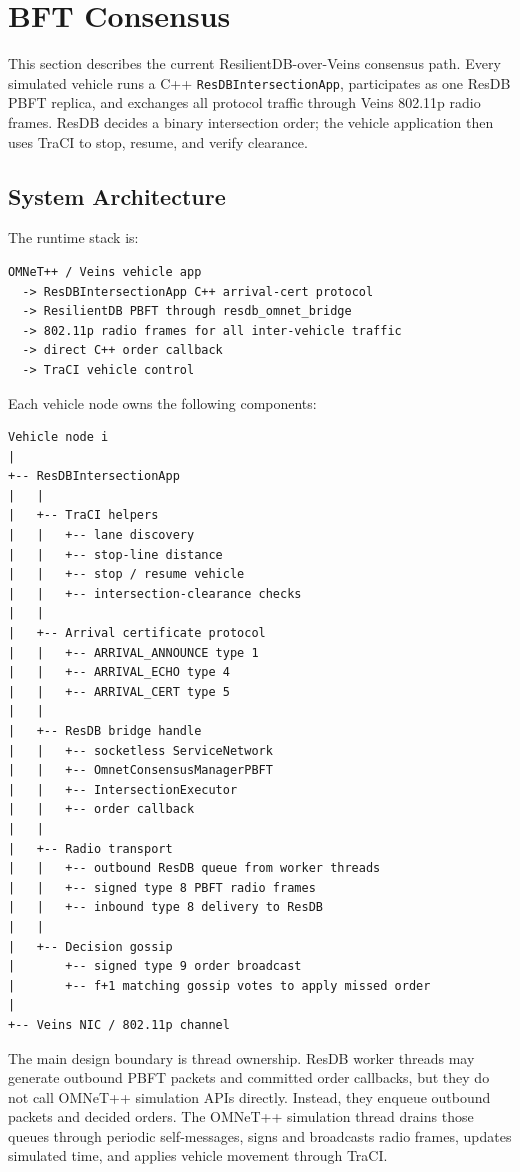 \documentclass[fleqn,10pt]{olplainarticle}
\begin{document}



\section{BFT Consensus}
\label{sec:bft-consensus}

This section describes the current ResilientDB-over-Veins consensus path. Every simulated vehicle runs a C++ \texttt{ResDBIntersectionApp}, participates as one ResDB PBFT replica, and exchanges all protocol traffic through Veins 802.11p radio frames. ResDB decides a binary intersection order; the vehicle application then uses TraCI to stop, resume, and verify clearance.

\subsection{System Architecture}
\label{subsec:resdb-system-architecture}

The runtime stack is:

\begin{verbatim}
OMNeT++ / Veins vehicle app
  -> ResDBIntersectionApp C++ arrival-cert protocol
  -> ResilientDB PBFT through resdb_omnet_bridge
  -> 802.11p radio frames for all inter-vehicle traffic
  -> direct C++ order callback
  -> TraCI vehicle control
\end{verbatim}

Each vehicle node owns the following components:

\begin{verbatim}
Vehicle node i
|
+-- ResDBIntersectionApp
|   |
|   +-- TraCI helpers
|   |   +-- lane discovery
|   |   +-- stop-line distance
|   |   +-- stop / resume vehicle
|   |   +-- intersection-clearance checks
|   |
|   +-- Arrival certificate protocol
|   |   +-- ARRIVAL_ANNOUNCE type 1
|   |   +-- ARRIVAL_ECHO type 4
|   |   +-- ARRIVAL_CERT type 5
|   |
|   +-- ResDB bridge handle
|   |   +-- socketless ServiceNetwork
|   |   +-- OmnetConsensusManagerPBFT
|   |   +-- IntersectionExecutor
|   |   +-- order callback
|   |
|   +-- Radio transport
|   |   +-- outbound ResDB queue from worker threads
|   |   +-- signed type 8 PBFT radio frames
|   |   +-- inbound type 8 delivery to ResDB
|   |
|   +-- Decision gossip
|       +-- signed type 9 order broadcast
|       +-- f+1 matching gossip votes to apply missed order
|
+-- Veins NIC / 802.11p channel
\end{verbatim}

The main design boundary is thread ownership. ResDB worker threads may generate outbound PBFT packets and committed order callbacks, but they do not call OMNeT++ simulation APIs directly. Instead, they enqueue outbound packets and decided orders. The OMNeT++ simulation thread drains those queues through periodic self-messages, signs and broadcasts radio frames, updates simulated time, and applies vehicle movement through TraCI.
\end{document}
